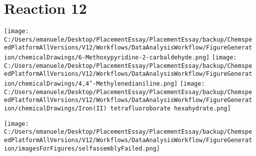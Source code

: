 \documentclass{article}%
\begin{document}
\section*{Reaction 12}%
%
\begin{scheme}[H]%
\begin{minipage}{0.5\textwidth}%
\texttt{[image: C:/Users/emanuele/Desktop/PlacementEssay/PlacementEssay/backup/ChemspeedPlatformAllVersions/V12/Workflows/DataAnalysisWorkflow/FigureGeneration/chemicalDrawings/6-Methoxypyridine-2-carbaldehyde.png]}%
\texttt{[image: C:/Users/emanuele/Desktop/PlacementEssay/PlacementEssay/backup/ChemspeedPlatformAllVersions/V12/Workflows/DataAnalysisWorkflow/FigureGeneration/chemicalDrawings/4,4'-Methylenedianiline.png]}%
\texttt{[image: C:/Users/emanuele/Desktop/PlacementEssay/PlacementEssay/backup/ChemspeedPlatformAllVersions/V12/Workflows/DataAnalysisWorkflow/FigureGeneration/chemicalDrawings/Iron(II) tetrafluoroborate hexahydrate.png]}%
\end{minipage}%
\begin{minipage}{0.5\textwidth}%
\begin{center}%
\texttt{[image: C:/Users/emanuele/Desktop/PlacementEssay/PlacementEssay/backup/ChemspeedPlatformAllVersions/V12/Workflows/DataAnalysisWorkflow/FigureGeneration/imagesForFigures/selfassemblyFailed.png]}%
\end{center}%
\end{minipage}%
\caption{Self-assembly of components 6, 17, with Iron(II) in a 3.0:1.5:1.0 molar ratio in CH$_3$CN at 60\textdegree C for 40h. These are the reagents (starting materials) for reaction 12.}%
\end{scheme}%
\end{document}

